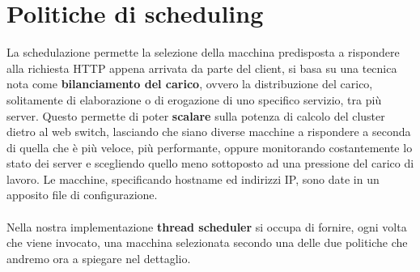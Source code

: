 \documentclass[italian]{tktltiki2}
\begin{document}
\section{Politiche di scheduling}
 \label{sec: sched_p}
La schedulazione permette la selezione della macchina predisposta a rispondere alla richiesta HTTP appena arrivata da parte del client, si basa su una tecnica nota come \textbf{bilanciamento del carico}, ovvero la distribuzione del carico, solitamente di elaborazione o di erogazione di uno specifico servizio, tra più server. Questo permette di poter \textbf{scalare} sulla potenza di calcolo del cluster dietro al web switch, lasciando che siano diverse macchine a rispondere a seconda di quella che è più veloce, più performante, oppure monitorando costantemente lo stato dei server e scegliendo quello meno sottoposto ad una pressione del carico di lavoro. Le macchine, specificando hostname ed indirizzi IP, sono date in un apposito file di configurazione.
\\
\\
Nella nostra implementazione \textbf{thread scheduler} si occupa di fornire,  ogni volta che viene invocato, una macchina selezionata secondo una delle due politiche che andremo ora a spiegare nel dettaglio.
\end{document}
